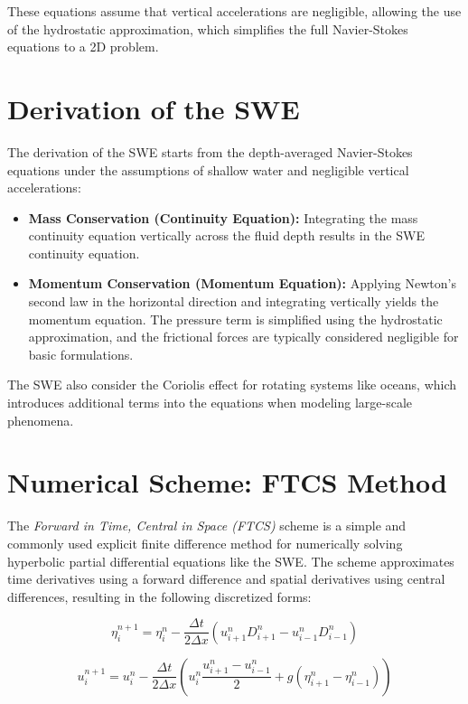 \documentclass[12pt]{article}
\begin{document}
These equations assume that vertical accelerations are negligible, allowing the use of the hydrostatic approximation, which simplifies the full Navier-Stokes equations to a 2D problem.

\section{Derivation of the SWE}

The derivation of the SWE starts from the depth-averaged Navier-Stokes equations under the assumptions of shallow water and negligible vertical accelerations:

\begin{itemize}
    \item \textbf{Mass Conservation (Continuity Equation):} Integrating the mass continuity equation vertically across the fluid depth results in the SWE continuity equation.
    \item \textbf{Momentum Conservation (Momentum Equation):} Applying Newton's second law in the horizontal direction and integrating vertically yields the momentum equation. The pressure term is simplified using the hydrostatic approximation, and the frictional forces are typically considered negligible for basic formulations.
\end{itemize}

The SWE also consider the Coriolis effect for rotating systems like oceans, which introduces additional terms into the equations when modeling large-scale phenomena.

\section{Numerical Scheme: FTCS Method}

The \textit{Forward in Time, Central in Space (FTCS)} scheme is a simple and commonly used explicit finite difference method for numerically solving hyperbolic partial differential equations like the SWE. The scheme approximates time derivatives using a forward difference and spatial derivatives using central differences, resulting in the following discretized forms:

\begin{equation}
\eta^{n+1}_i = \eta^n_i - \frac{\Delta t}{2\Delta x} \left( u^n_{i+1}D^n_{i+1} - u^n_{i-1}D^n_{i-1} \right)
\end{equation}

\begin{equation}
u^{n+1}_i = u^n_i - \frac{\Delta t}{2\Delta x} \left( u^n_i \frac{u^n_{i+1} - u^n_{i-1}}{2} + g (\eta^n_{i+1} - \eta^n_{i-1}) \right)
\end{equation}
\end{document}

